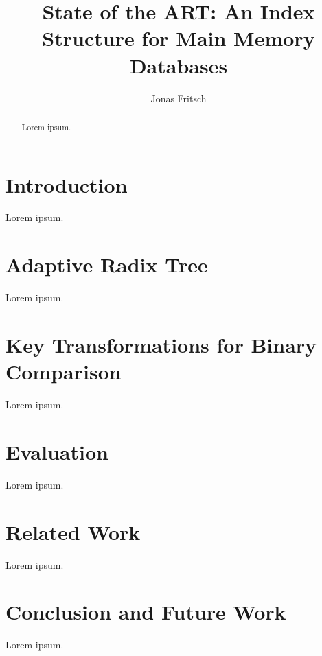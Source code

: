 \documentclass[acmtog, nonacm]{acmart}
\begin{document}
\title{State of the ART: An Index Structure for Main Memory Databases}

\author{Jonas Fritsch}

\begin{abstract}
    Lorem ipsum.
\end{abstract}

\maketitle

\section{Introduction}
Lorem ipsum. \cite{baskins2004judy}

\section{Adaptive Radix Tree}
Lorem ipsum.

\section{Key Transformations for Binary Comparison}
Lorem ipsum. \cite{leis2013adaptive}

\section{Evaluation}
Lorem ipsum.

\section{Related Work}
Lorem ipsum.

\section{Conclusion and Future Work}
Lorem ipsum.



\end{document}
